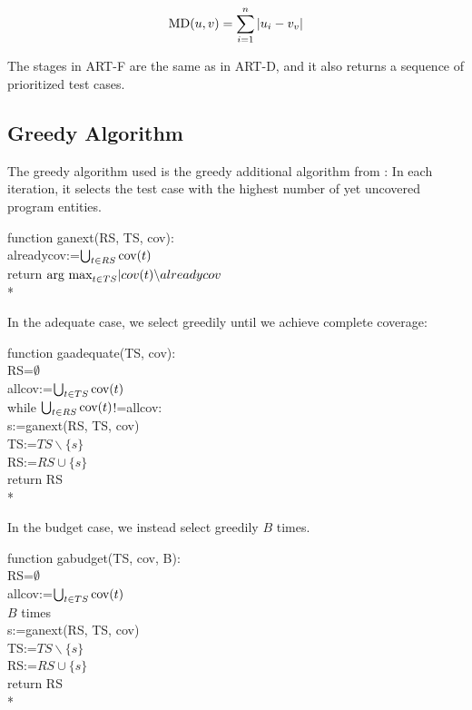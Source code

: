$$\hbox{MD}(u, v)=\sum_{i=1}^{n}|u_i-v_v|$$

The stages in ART-F are the same as in ART-D, and it also returns a
sequence of prioritized test cases.

\subsection{Greedy Algorithm}

The greedy algorithm used is the greedy additional algorithm from
\cite{rothermel2001prioritizing}: In each iteration, it selects the test
case with the highest number of yet uncovered program entities.

function ganext(RS, TS, cov): \\
	alreadycov:=$\bigcup_{t \in RS} \hbox{cov}(t)$ \\
	return $\hbox{arg max}_{t \in TS} |cov(t)\backslash alreadycov$ \\*

In the adequate case, we select greedily until we achieve complete
coverage:

function gaadequate(TS, cov): \\
	RS=$\emptyset$ \\
	allcov:=$\bigcup_{t \in TS} \hbox{cov}(t)$ \\
	while $\bigcup_{t \in RS} \hbox{cov}(t)$!=allcov: \\
		s:=ganext(RS, TS, cov) \\
		TS:=$TS \backslash \{s\}$ \\
		RS:=$RS \cup \{s\}$ \\
	return RS \\*

In the budget case, we instead select greedily $B$ times.

function gabudget(TS, cov, B): \\
	RS=$\emptyset$ \\
	allcov:=$\bigcup_{t \in TS} \hbox{cov}(t)$ \\
	$B$ times \\
		s:=ganext(RS, TS, cov) \\
		TS:=$TS \backslash \{s\}$ \\
		RS:=$RS \cup \{s\}$ \\
	return RS \\*

